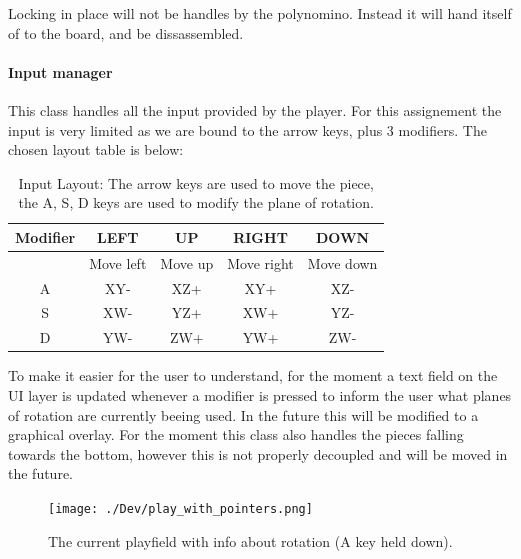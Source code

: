 \documentclass{article}
\begin{document}
Locking in place will not be handles by the polynomino. Instead it will hand itself of to the board, and be dissassembled.


\paragraph{Input manager}
This class handles all the input provided by the player. For this assignement the input is very limited as we are bound to the arrow keys, plus 3 modifiers. The chosen layout table is below:
\begin{table}[H]
    \centering
    \begin{tabular}{|c|c|c|c|c|}
    \hline
    Modifier & LEFT & UP & RIGHT& DOWN\\
    \hline
     & Move left & Move up & Move right & Move down\\
    A & XY- & XZ+ & XY+ & XZ-\\
    S & XW- & YZ+ & XW+ & YZ-\\
    D & YW- & ZW+ & YW+ & ZW-\\
    \hline
    \end{tabular}
    \caption{Input Layout: The arrow keys are used to move the piece, the A, S, D keys are used to modify the plane of rotation.}
    \label{tab:input}
\end{table}
To make it easier for the user to understand, for the moment a text field on the UI layer is updated whenever a modifier is pressed to inform the user what planes of rotation are currently beeing used. In the future this will be modified to a graphical overlay.
For the moment this class also handles the pieces falling towards the bottom, however this is not properly decoupled and will be moved in the future.
\begin{figure}
    \centering
    \texttt{[image: ./Dev/play\_with\_pointers.png]}
    \caption{The current playfield with info about rotation (A key held down).}
    \label{fig:input}
\end{figure}
\end{document}
